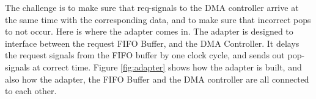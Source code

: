 \begin{appendix}

The challenge is to make sure that req-signals to the DMA controller arrive at the same time with the corresponding data, and to make sure that incorrect pops to not occur.
Here is where the adapter comes in.
The adapter is designed to interface between the request FIFO Buffer, and the DMA Controller. 
It delays the request signals from the FIFO buffer by one clock cycle, and sends out pop-signals at correct time.
Figure \ref{fig:adapter} shows how the adapter is built, and also how the adapter, the FIFO Buffer and the DMA controller are all connected to each other.



\end{appendix}
